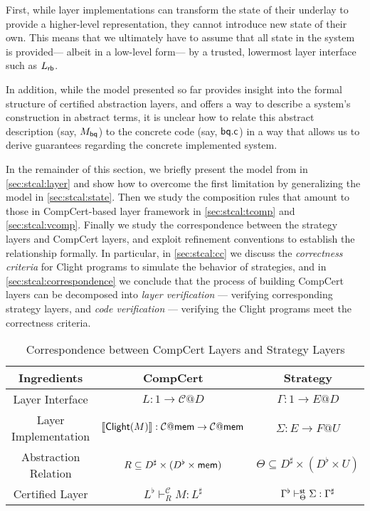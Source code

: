 \documentclass[acmsmall,review,anonymous]{acmart}\settopmatter{printfolios=true,printccs=false,printacmref=false}
\begin{document}
First,
while layer implementations
can transform the state of their underlay
to provide a higher-level representation,
they cannot introduce new state of their own.
This means that we ultimately have to assume that
all state in the system is provided---%
albeit in a low-level form---%
by a trusted, lowermost layer interface
such as $L_{ \mathsf{rb} }$.

In addition,
while the model presented so far
provides insight into the formal structure
of certified abstraction layers,
and offers a way to describe a system's construction
in abstract terms,
it is unclear how to relate
this abstract description (say, $M_{ \mathsf{bq} }$)
to the concrete code (say, $ \mathsf{bq.c} $)
in a way that allows us to derive guarantees
regarding the concrete implemented system.


In the remainder of this section,
we briefly present the model from \citet{rbgs-cal}
in \ref{sec:stcal:layer}
and show how to overcome the first limitation
by generalizing the model
in \ref{sec:stcal:state}.
Then we study the composition rules
that amount to those
in CompCert-based layer framework
in \ref{sec:stcal:tcomp}
and \ref{sec:stcal:vcomp}.
Finally we study the correspondence between
the strategy layers and CompCert layers,
and exploit refinement conventions
to establish the relationship formally.
In particular,
in \ref{sec:stcal:cc}
we discuss the \emph{correctness criteria} for Clight programs
to simulate the behavior of strategies,
and
in \ref{sec:stcal:correspondence}
we conclude that
the process of building CompCert layers
can be decomposed into
\emph{layer verification} ---
verifying corresponding strategy layers,
and \emph{code verification} ---
verifying the Clight programs meet
the correctness criteria.

\begin{table}
  \centering
  \begin{tabular}{ccc}
    \toprule
    Ingredients
    & CompCert
    & Strategy \\
    \midrule
    Layer Interface
    & $L: 1 \rightarrow \mathcal{C}@D$
    & $\Gamma: 1 \rightarrow E@D$\\
    Layer Implementation
    & $\llbracket  \mathsf{Clight} (M) \rrbracket
      : \mathcal{C}@ \mathsf{mem}  \rightarrow \mathcal{C}@ \mathsf{mem} $
    & $\Sigma : E \rightarrow F@U$\\
    Abstraction Relation
    & $R \subseteq D^\sharp \times (D^\flat \times  \mathsf{mem} )$
    & $\Theta \subseteq D^\sharp \times (D^\flat \times U)$\\
    Certified Layer
    & $L^\flat \vdash^\mathcal{C}_R M : L^\sharp$
    & $\Gamma^\flat \vdash^{ \mathsf{st} }_\Theta \Sigma : \Gamma^\sharp$\\
    \bottomrule
  \end{tabular}
  \\
  \caption{Correspondence between CompCert Layers and Strategy Layers}
  \label{tab:correspondence}
\end{table}
\end{document}
